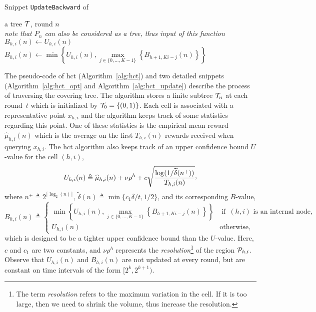 \begin{algorithm}[ht]
\centering
\caption{Snippet \texttt{UpdateBackward} of \HCT{}}
\label{alg:hct_update}
\begin{algorithmic}[1]
     a tree $\mathcal{T}$, round $n$ \\ \hfil \emph{note that $P_n$ can also be considered as a tree, thus input of this function}
            \State $B_{h,i}(n) \gets U_{h,i}(n)$
        \Else 
            \State $B_{h,i}(n) \gets \min\left\{U_{h,i}(n),\underset{j\in\{0,\ldots,K-1\}}{\max} \left\{B_{h+1,Ki-j}(n)\right\} \right\}$
        \EndIf
    \EndFor
\end{algorithmic}
\end{algorithm}

The pseudo-code of \gls{hct} (Algorithm~\ref{alg:hct}) and two detailed snippets (Algorithm~\ref{alg:hct_opt} and Algorithm~\ref{alg:hct_update}) describe the process of traversing the covering tree.
The algorithm stores a finite subtree $\mathcal{T}_n$ at each round~$t$ which is initialized by $\mathcal{T}_0 = \{(0,1)\}$. Each cell is associated with a representative point $x_{h,i}$ and the algorithm keeps track of some statistics regarding this point. One of these statistics is the empirical mean reward $\hat{\mu}_{h,i}(n)$ which is the average on the first $T_{h,i}(n)$ rewards received when querying $x_{h,i}$.
The \gls{hct} algorithm also keeps track of an upper confidence bound $U$-value for the cell $(h,i)$,
\[
	U_{h,i}(n) \triangleq \hat{\mu}_{h,i}(n) + \nu\rho^{h} + c\sqrt{\frac{\operatorname{log}(1/\tilde{\delta}(n^+))}{T_{h,i}(n)}}\CommaBin
\]
where $n^+\triangleq2^{\lceil \operatorname{log}_2(n) \rceil}$, $\tilde{\delta}(n)\triangleq\min\{c_1\delta/t,1/2\}$, and its corresponding $B$-value,
\begin{equation*}
	B_{h,i}(n) \triangleq
	\left\{ \begin{array}{ll}
				\min\left\{U_{h,i}(n),\underset{j\in\{0,\ldots,K-1\}}{\max} \left\{B_{h+1,Ki-j}(n)\right\} \right\} & \operatorname{if}~(h,i) \text{ is an internal node,}\\
				U_{h,i}(n) & \operatorname{otherwise,}
			\end{array}\right.
\end{equation*}
which is designed to be a tighter upper confidence bound than the $U$-value. Here, $c$ and $c_1$ are two constants, and $\nu\rho^h$ represents the \emph{resolution}\footnote{The term \emph{resolution} refers to the maximum variation in the cell. If it is too large, then we need to shrink the volume, thus increase the resolution.} of the region $\mathcal{P}_{h,i}$. Observe that $U_{h,i}(n)$ and $B_{h,i}(n)$ are not updated at every round, but are constant on time intervals of the form $[2^k,2^{k+1})$.

